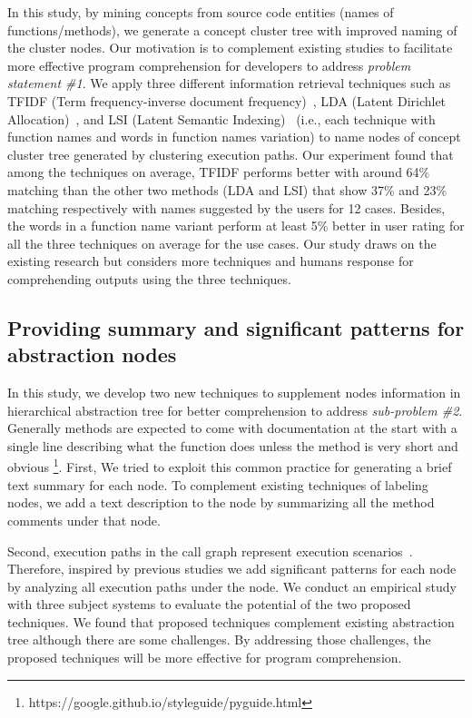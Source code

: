 In this study, by mining concepts from source code entities (names of functions/methods), we generate a concept cluster tree
with improved naming of the cluster nodes. Our motivation is to complement existing studies to facilitate more effective program comprehension for
developers to address \emph{problem statement \#1}. We apply three different information retrieval techniques such as TFIDF (Term frequency-inverse document frequency)~\cite{ramos2003usingTfidfRelevance}, LDA (Latent  Dirichlet  Allocation)~\cite{blei2003latentLDA}, and LSI (Latent Semantic Indexing)~\cite{deerwester1990indexingLSI} (i.e., each technique with function
names and words in function names variation) to name nodes of concept cluster tree generated by clustering execution paths. Our experiment found that among the techniques on average, TFIDF performs better with around 64\% matching than the other
two methods (LDA and LSI) that show 37\% and 23\% matching respectively with names suggested by the users for 12 cases. Besides,
the words in a function name variant perform at least 5\% better in user rating for all the three techniques on average for the use cases.
Our study draws on the existing research but considers more techniques and humans response for comprehending outputs using the three
techniques.

\subsection{Providing summary and significant patterns for abstraction nodes}

In this study, we develop two new techniques to supplement nodes information in hierarchical abstraction tree for better comprehension to address \emph{sub-problem \#2}. Generally methods are expected to come with documentation at the start with a single line describing what the function does unless the method is very short and obvious \footnote{https://google.github.io/styleguide/pyguide.html}. First, We tried to exploit this common practice for generating a brief text summary for each node. 
To complement existing techniques of labeling nodes, we add a text description to the node by summarizing all the method comments under that node. 

Second, execution paths in the call graph represent execution scenarios~\cite{salah2005scenariographer,pradel2009automatic}. Therefore, inspired by previous studies \cite{salah2005scenariographerReverseEngineering, pradel2009automaticUseageSpecification} we add significant patterns for each node by analyzing all execution paths under the node. We conduct an empirical study with three subject systems to evaluate the potential of the two proposed techniques. We found that proposed techniques complement existing abstraction tree although there are some challenges. By addressing those challenges, the proposed techniques will be more effective for program comprehension. 


